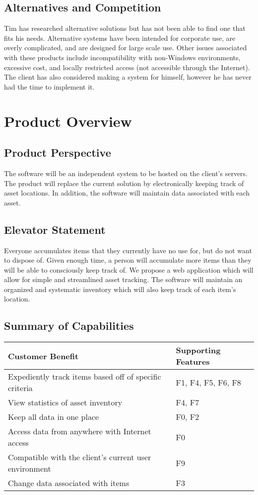 \documentclass{article}
\begin{document}
\subsection{Alternatives and Competition}
Tim has researched alternative solutions but has not been able to find one that fits his needs.  Alternative systems have been intended for corporate use, are overly complicated, and are designed for large scale use.  Other issues associated with these products include incompatibility with non-Windows environments, excessive cost, and locally restricted access (not accessible through the Internet).  The client has also considered making a system for himself, however he has never had the time to implement it.

\section{Product Overview}

\subsection{Product Perspective}
The software will be an independent system to be hosted on the client's servers.  The product will replace the current solution by electronically keeping track of asset locations. In addition, the software will maintain data associated with each asset.

\subsection{Elevator Statement}
Everyone accumulates items that they currently have no use for, but do not want to dispose of.  Given enough time, a person will accumulate more items than they will be able to consciously keep track of. We propose a web application which will allow for simple and streamlined asset tracking. The software will maintain an organized and systematic inventory which will also keep track of each item's location.

\subsection{Summary of Capabilities}
\begin{tabular}{ | p{4.0in} | p{2.0in} | }
\hline
\textbf{Customer Benefit} & \textbf{Supporting Features}\\
\hline
\hline
Expediently track items based off of specific criteria & F1, F4, F5, F6, F8\\
\hline
View statistics of asset inventory & F4, F7\\
\hline
Keep all data in one place & F0, F2\\
\hline
Access data from anywhere with Internet access & F0\\
\hline
Compatible with the client's current user environment & F9\\
\hline
Change data associated with items & F3\\
\hline
\end{tabular}
\end{document}
